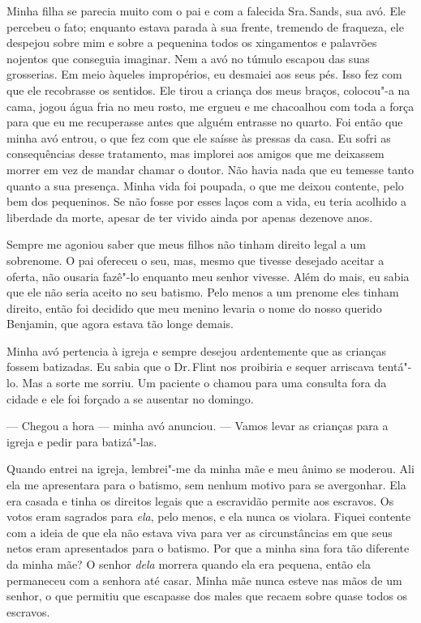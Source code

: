 Minha filha se parecia muito com o pai e com a falecida Sra.\,Sands, sua
avó. Ele percebeu o fato; enquanto estava parada à sua frente, tremendo
de fraqueza, ele despejou sobre mim e sobre a pequenina todos os
xingamentos e palavrões nojentos que conseguia imaginar. Nem a avó no
túmulo escapou das suas grosserias. Em meio àqueles impropérios, eu
desmaiei aos seus pés. Isso fez com que ele recobrasse os sentidos. Ele
tirou a criança dos meus braços, colocou"-a na cama, jogou água fria no
meu rosto, me ergueu e me chacoalhou com toda a força para que eu me
recuperasse antes que alguém entrasse no quarto. Foi então que minha avó
entrou, o que fez com que ele saísse às pressas da casa. Eu sofri as
consequências desse tratamento, mas implorei aos amigos que me deixassem
morrer em vez de mandar chamar o doutor. Não havia nada que eu temesse
tanto quanto a sua presença. Minha vida foi poupada, o que me deixou
contente, pelo bem dos pequeninos. Se não fosse por esses laços com a
vida, eu teria acolhido a liberdade da morte, apesar de ter vivido ainda
por apenas dezenove anos.

Sempre me agoniou saber que meus filhos
não tinham direito legal a um sobrenome. O pai ofereceu o seu, mas,
mesmo que tivesse desejado aceitar a oferta, não ousaria fazê"-lo
enquanto meu senhor vivesse. Além do mais, eu sabia que ele não seria
aceito no seu batismo. Pelo menos a um prenome eles tinham direito,
então foi decidido que meu menino levaria o nome do nosso querido
Benjamin, que agora estava tão longe demais.

Minha avó pertencia à igreja e sempre
desejou ardentemente que as crianças fossem batizadas. Eu sabia que o
Dr.\,Flint nos proibiria e sequer arriscava tentá"-lo. Mas a sorte me
sorriu. Um paciente o chamou para uma consulta fora da cidade e ele foi
forçado a se ausentar no domingo.

--- Chegou a hora --- minha avó anunciou. --- Vamos levar as crianças
para a igreja e pedir para batizá"-las.

Quando entrei na igreja, lembrei"-me da
minha mãe e meu ânimo se moderou. Ali ela me apresentara para o batismo,
sem nenhum motivo para se avergonhar. Ela era casada e tinha os direitos
legais que a escravidão permite aos escravos. Os votos eram sagrados
para \emph{ela}, pelo menos, e ela nunca os violara. Fiquei contente com
a ideia de que ela não estava viva para ver as circunstâncias em que
seus netos eram apresentados para o batismo. Por que a minha sina fora
tão diferente da minha mãe? O senhor \emph{dela} morrera quando ela era
pequena, então ela permaneceu com a senhora até casar. Minha mãe nunca
esteve nas mãos de um senhor, o que permitiu que escapasse dos males que
recaem sobre quase todos os escravos.

